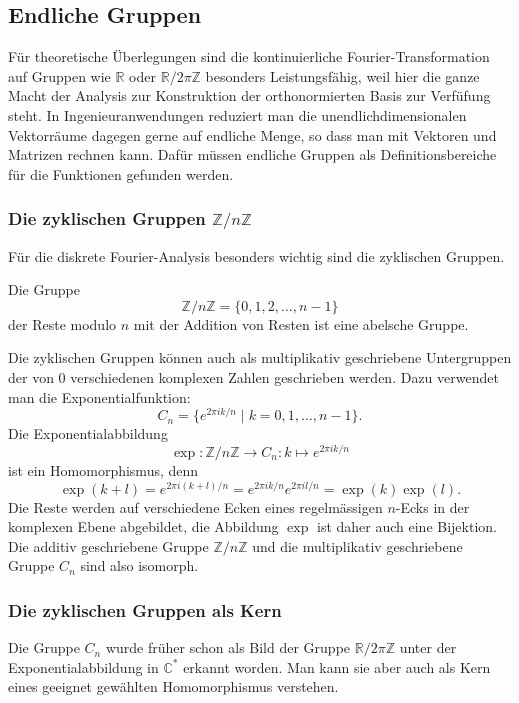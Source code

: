 %
%
%

%
%
\subsection{Endliche Gruppen
\label{buch:gruppen:subsection:endliche-gruppen}}
Für theoretische Überlegungen sind die kontinuierliche
Fourier-Transformation auf Gruppen wie $\mathbb{R}$ oder
$\mathbb{R}/2\pi\mathbb{Z}$ besonders Leistungsfähig, weil hier die
ganze Macht der Analysis zur Konstruktion der orthonormierten Basis
zur Verfüfung steht.
In Ingenieuranwendungen reduziert man die unendlichdimensionalen
Vektorräume dagegen gerne auf endliche Menge, so dass man mit
Vektoren und Matrizen rechnen kann.
Dafür müssen endliche Gruppen als Definitionsbereiche für die Funktionen
gefunden werden.

%
%
\subsubsection{Die zyklischen Gruppen $\mathbb{Z}/n\mathbb{Z}$}
Für die diskrete Fourier-Analysis besonders wichtig sind die zyklischen
Gruppen.

\begin{definition}
\label{buch:gruppen:endliche-gruppen:def:zyklisch}
Die Gruppe
\[
\mathbb{Z}/n\mathbb{Z}
=
\{0,1,2,\dots,n-1\}
\]
der Reste modulo $n$ mit der Addition von Resten ist eine abelsche
Gruppe.
\end{definition}

Die zyklischen Gruppen können auch als multiplikativ geschriebene
Untergruppen der von $0$ verschiedenen komplexen Zahlen geschrieben
werden.
Dazu verwendet man die Exponentialfunktion:
\[
C_n
=
\{ e^{2\pi ik/n}\mid k=0,1,\dots,n-1\}.
\]
Die Exponentialabbildung
\[
\exp
\colon
\mathbb{Z}/n\mathbb{Z}
\to
C_n
:
k\mapsto e^{2\pi ik/n}
\]
ist ein Homomorphismus, denn
\[
\exp(k+l)
=
e^{2\pi i(k+l)/n}
=
e^{2\pi ik/n}
e^{2\pi il/n}
=
\exp(k)\exp(l).
\]
Die Reste werden auf verschiedene Ecken eines regelmässigen
$n$-Ecks in der komplexen Ebene abgebildet, die Abbildung $\exp$
ist daher auch eine Bijektion.
Die additiv geschriebene Gruppe $\mathbb{Z}/n\mathbb{Z}$ und
die multiplikativ geschriebene Gruppe $C_n$ sind also isomorph.

%
%
\subsubsection{Die zyklischen Gruppen als Kern}
Die Gruppe $C_n$ wurde früher schon als Bild der Gruppe
$\mathbb{R}/2\pi\mathbb{Z}$ unter der Exponentialabbildung 
in $\mathbb{C}^*$ erkannt worden.
Man kann sie aber auch als Kern eines geeignet gewählten Homomorphismus
verstehen.


